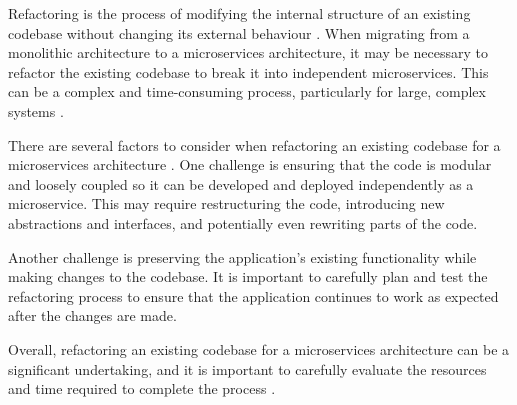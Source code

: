 Refactoring is the process of modifying the internal structure of an existing
codebase without changing its external behaviour \cite{becker1999refactoring}.
When migrating from a monolithic architecture to a microservices architecture,
it may be necessary to refactor the existing codebase to break it into
independent microservices. This can be a complex and time-consuming process,
particularly for large, complex systems \cite{newman2019monolith}.

There are several factors to consider when refactoring an existing codebase for
a microservices architecture \cite{newman2019monolith}. One challenge is
ensuring that the code is modular and loosely coupled so it can be developed
and deployed independently as a microservice. This may require restructuring
the code, introducing new abstractions and interfaces, and potentially even
rewriting parts of the code.

Another challenge is preserving the application's existing functionality while
making changes to the codebase. It is important to carefully plan and test the
refactoring process to ensure that the application continues to work as
expected after the changes are made.

Overall, refactoring an existing codebase for a microservices architecture can
be a significant undertaking, and it is important to carefully evaluate the
resources and time required to complete the process \cite{newman2019monolith}.
